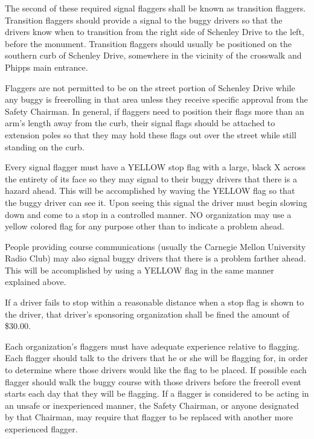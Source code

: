     The second of these required signal flaggers shall be known as transition
    flaggers. Transition flaggers should provide a signal to the buggy drivers
    so that the drivers know when to transition from the right side of Schenley
    Drive to the left, before the monument. Transition flaggers should usually
    be positioned on the southern curb of Schenley Drive, somewhere in the
    vicinity of the crosswalk and Phipps main entrance.

	Flaggers are not permitted to be on the street portion of Schenley
    Drive while any buggy is freerolling in that area unless they receive
	specific approval from the Safety Chairman. In general, if flaggers need
	to position their flags more than an arm's length away from the curb, their
	signal flags should be attached to extension poles so that they may hold these
	flags out over the street while still standing on the curb.

	Every signal flagger must have a YELLOW stop flag with a large, black X
	across the entirety of its face so they may signal to their buggy drivers
	that there is a hazard ahead. This will be accomplished by waving the YELLOW flag so
	that the buggy driver can see it. Upon seeing this signal the driver must begin
	slowing down and come to a stop in a controlled manner. NO organization may use a
	yellow colored flag for any purpose other than to indicate a problem ahead.

	People providing course communications (usually the Carnegie Mellon
	University Radio Club) may also signal buggy drivers that there is a problem
	farther ahead. This will be accomplished by using a YELLOW flag in the same
	manner explained above.

    If a driver fails to stop within a reasonable distance when a stop flag is shown to the
    driver, that driver's sponsoring organization shall be fined the amount of \$30.00.

	Each organization's flaggers must have adequate experience relative to
	flagging. Each flagger should talk to the drivers that he or she
	will be flagging for, in order to determine where those drivers would like the
	flag to be placed. If possible each flagger should walk the buggy course
	with those drivers before the freeroll event starts each day that
	they will be flagging. If a flagger is considered to be acting in an
	unsafe or inexperienced manner, the Safety Chairman, or anyone designated by
	that Chairman, may require that flagger to be replaced with another more
	experienced flagger.

